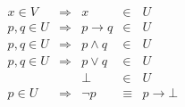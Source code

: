 \documentclass{standalone}
\begin{document}
$
\begin{array}{rcrcl}
x\in{}V   & \Longrightarrow & x               & \in    & U                \\
p,q\in{}U & \Longrightarrow & p\rightarrow{}q & \in    & U                \\
p,q\in{}U & \Longrightarrow & p\land{}q       & \in    & U                \\
p,q\in{}U & \Longrightarrow & p\lor{}q        & \in    & U                \\
          &                 & \bot            & \in    & U                \\
p\in{}U   & \Longrightarrow & \lnot{}p        & \equiv & p\rightarrow\bot \\
\end{array}
$
\end{document}
